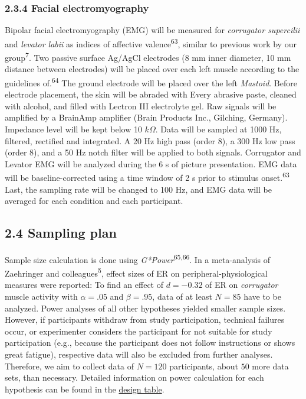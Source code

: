 \documentclass[
  english,
  man,floatsintext]{apa6}
\begin{document}
\hypertarget{facial-electromyography}{%
\subsubsection{2.3.4 Facial electromyography}\label{facial-electromyography}}

Bipolar facial electromyography (EMG) will be measured for \emph{corrugator supercilii} and \emph{levator labii} as indices of affective valence\textsuperscript{63}, similar to previous work by our group\textsuperscript{7}.
Two passive surface Ag/AgCl electrodes (8 mm inner diameter, 10 mm distance between electrodes) will be placed over each left muscle according to the guidelines of.\textsuperscript{64}
The ground electrode will be placed over the left \emph{Mastoid}.
Before electrode placement, the skin will be abraded with Every abrasive paste, cleaned with alcohol, and filled with Lectron III electrolyte gel.
Raw signals will be amplified by a BrainAmp amplifier (Brain Products Inc., Gilching, Germany).
Impedance level will be kept below 10 \(k\Omega\).
Data will be sampled at 1000 Hz, filtered, rectified and integrated.
A 20 Hz high pass (order 8), a 300 Hz low pass (order 8), and a 50 Hz notch filter will be applied to both signals.
Corrugator and Levator EMG will be analyzed during the 6 s of picture presentation.
EMG data will be baseline-corrected using a time window of 2 s prior to stimulus onset.\textsuperscript{63}
Last, the sampling rate will be changed to 100 Hz, and EMG data will be averaged for each condition and each participant.

\hypertarget{sampling-plan}{%
\subsection{2.4 Sampling plan}\label{sampling-plan}}

Sample size calculation is done using \emph{G*Power}\textsuperscript{65,66}.
In a meta-analysis of Zaehringer and colleagues\textsuperscript{5}, effect sizes of ER on peripheral-physiological measures were reported:
To find an effect of \(d=-0.32\) of ER on \emph{corrugator} muscle activity with \(\alpha=.05\) and \(\beta=.95\), data of at least \(N=85\) have to be analyzed.
Power analyses of all other hypotheses yielded smaller sample sizes.
However, if participants withdraw from study participation, technical failures occur, or experimenter considers the participant for not suitable for study participation (e.g., because the participant does not follow instructions or shows great fatigue), respective data will also be excluded from further analyses.
Therefore, we aim to collect data of \(N=120\) participants, about \(50%
\) more data sets, than necessary.
Detailed information on power calculation for each hypothesis can be found in the \protect\hyperlink{DesignTable}{design table}.
\end{document}
